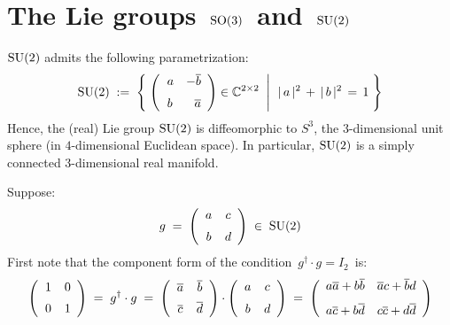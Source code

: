 
\vskip 1.0cm
\section{The Lie groups \,$\textnormal{SO}(3)$\, and \,$\textnormal{SU}(2)$}


\vskip 0.2cm
\begin{proposition}
\mbox{}
\vskip 0.1cm
\noindent
$\textnormal{SU}(2)$ admits the following parametrization:
\begin{equation*}
\textnormal{SU}{(2)}
\; := \;
	\left\{\,
		\left.
		\left(\begin{array}{rr}
		a & -\overline{b}
		\\
		\overset{{\color{white}-}}{b} & \overline{a}
		\end{array}\right)
		\overset{{\color{white}.}}{\in}
		\C^{2 \times 2}
		\;\;\right\vert\;\,
			\vert\, a \,\vert^{2} \,+\, \vert\, b \,\vert^{2} \,=\, 1
		\;\right\}
\end{equation*}
Hence, the (real) Lie group {\color{red}$\textnormal{SU}(2)$ is diffeomorphic to $S^{3}$}, the $3$-dimensional unit sphere
(in $4$-dimensional Euclidean space).
In particular, $\textnormal{SU}(2)$ is a {\color{red}simply connected} $3$-dimensional real manifold.
\end{proposition}
\proof
Suppose:
\begin{equation*}
g
\; = \;
	\left(\begin{array}{cc}
		a & c
		\\
		\overset{{\color{white}-}}{b} & d
		\end{array}\right)
\; \in \;
\textnormal{SU}(2)
\end{equation*}
First note that the component form of the condition \,$g^{\dagger}\cdot g = I_{2}$\, is:
\begin{equation*}
\left(\begin{array}{cc}
	1 & 0
	\\
	\overset{{\color{white}-}}{0} & 1
	\end{array}\right)
\; = \;
	g^{\dagger} \cdot g
\; = \;
	\left(\begin{array}{cc}
		\overline{a} & \overline{b}
		\\
		\overset{{\color{white}-}}{\overline{c}} & \overline{d}
		\end{array}\right)
	\cdot
	\left(\begin{array}{cc}
		a & c
		\\
		\overset{{\color{white}-}}{b} & d
		\end{array}\right)
\; = \;
	\left(\begin{array}{cc}
		a\overline{a} + b\overline{b} & \overline{a}c + \overline{b}d
		\\
		\overset{{\color{white}-}}{a\overline{c} + b\overline{d}} & c\overline{c} + d\overline{d}
		\end{array}\right)
\end{equation*}
